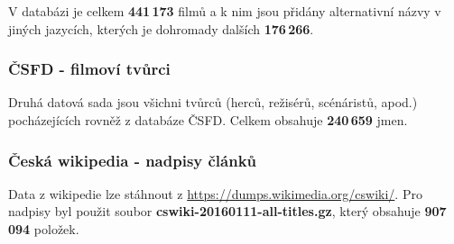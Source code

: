 \documentclass[11pt,letterpaper,oneside,openright]{book}
\begin{document}
V databázi je celkem \textbf{441\,173} filmů a k nim jsou přidány
alternativní názvy v jiných jazycích, kterých je dohromady dalších
\textbf{176\,266}.

\subsubsection{ČSFD - filmoví tvůrci}
Druhá datová sada jsou všichni tvůrců (herců, režisérů, scénáristů,
apod.) pocházejících rovněž z databáze ČSFD. Celkem obsahuje
\textbf{240\,659} jmen.

\subsubsection{Česká wikipedia - nadpisy článků}
Data z wikipedie lze stáhnout z \url{https://dumps.wikimedia.org/cswiki/}. Pro
nadpisy byl použit soubor \textbf{cswiki-20160111-all-titles.gz}, který
obsahuje \textbf{907\,094} položek.

%
\end{document}
